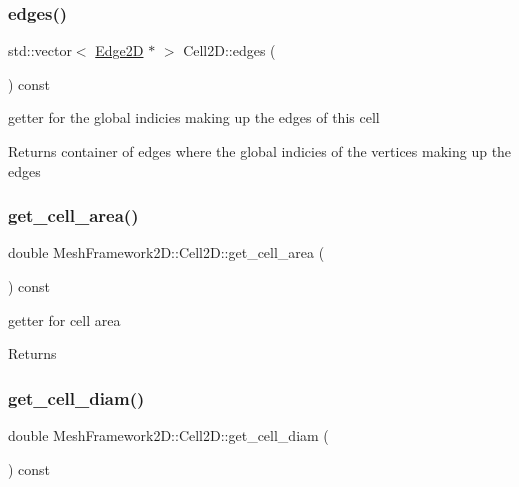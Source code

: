 \subsubsection{\texorpdfstring{edges()}{edges()}}
{\footnotesize\ttfamily std\+::vector$<$ \hyperlink{classMeshFramework2D_1_1Edge2D}{Edge2D} $\ast$ $>$ Cell2\+D\+::edges (\begin{DoxyParamCaption}{ }\end{DoxyParamCaption}) const}



getter for the global indicies making up the edges of this cell 

\begin{DoxyReturn}{Returns}
container of edges where the global indicies of the vertices making up the edges 
\end{DoxyReturn}
\mbox{\label{classMeshFramework2D_1_1Cell2D_aa77363c693484427ca71d607e376be2f}} 
\subsubsection{\texorpdfstring{get\+\_\+cell\+\_\+area()}{get\_cell\_area()}}
{\footnotesize\ttfamily double Mesh\+Framework2\+D\+::\+Cell2\+D\+::get\+\_\+cell\+\_\+area (\begin{DoxyParamCaption}{ }\end{DoxyParamCaption}) const\hspace{0.3cm}{\ttfamily [inline]}}



getter for cell area 

\begin{DoxyReturn}{Returns}

\end{DoxyReturn}
\mbox{\label{classMeshFramework2D_1_1Cell2D_abf59b323d39cda1f6f65c6ba83247ca9}} 
\subsubsection{\texorpdfstring{get\+\_\+cell\+\_\+diam()}{get\_cell\_diam()}}
{\footnotesize\ttfamily double Mesh\+Framework2\+D\+::\+Cell2\+D\+::get\+\_\+cell\+\_\+diam (\begin{DoxyParamCaption}{ }\end{DoxyParamCaption}) const\hspace{0.3cm}{\ttfamily [inline]}}



